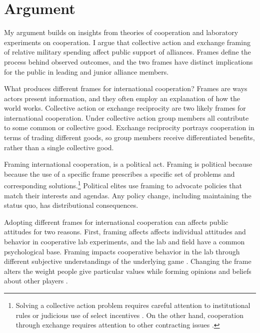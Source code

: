 \documentclass[12pt]{article}
\begin{document}
\section{Argument}



My argument builds on insights from theories of cooperation and laboratory experiments on cooperation. 
I argue that collective action and exchange framing of relative military spending affect public support of alliances. 
Frames define the process behind observed outcomes, and the two frames have distinct implications for the public in leading and junior alliance members. 


What produces different frames for international cooperation? 
Frames are ways actors present information, and they often employ an explanation of how the world works. %
Collective action or exchange reciprocity are two likely frames for international cooperation.
Under collective action group members all contribute to some common or collective good. 
Exchange reciprocity portrays cooperation in terms of trading different goods, so group members receive differentiated benefits, rather than a single collective good. 


Framing international cooperation, is a political act.  
Framing is political because because the use of a specific frame prescribes a specific set of problems and corresponding solutions.\footnote{Solving a collective action problem requires careful attention to institutional rules \citep{Ostrom1990} or judicious use of select incentives \citep{Olson1972, Hardin1982}.
On the other hand, cooperation through exchange requires attention to other contracting issues \citep{Williamson1985}.}  
Political elites use framing to advocate policies that match their interests and agendas.
Any policy change, including maintaining the status quo, has distributional consequences. 


Adopting different frames for international cooperation can affects public attitudes for two reasons. 
First, framing affects affects individual attitudes and behavior in cooperative lab experiments, and the lab and field have a common psychological base. 
Framing impacts cooperative behavior in the lab through different subjective understandings of the underlying game \citep{Cookson2000, CartwrightRamalingam2019}. 
Changing the frame alters the weight people give particular values while forming opinions \citep{ChongDruckman2007} and beliefs about other players \citep{Dufwenbergetal2011}.
\end{document}
